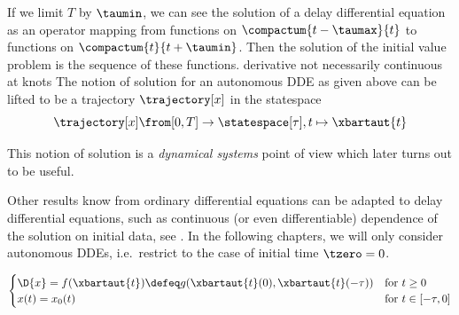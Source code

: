        \cite{Roussel04DDEs}
    If we limit $T$ by $\taumin$, we can see the solution of a delay differential equation as an operator mapping from functions on $\compactum{t-\taumax}{t}$ to functions on $\compactum{t}{t+\taumin}$.
    Then the solution of the initial value problem is the sequence of these functions.
    derivative not necessarily continuous at knots
    The notion of solution for an autonomous DDE as given above can be lifted to be a trajectory $\trajectory[x]$ in the statespace
    \begin{equation}
        \trajectory[x] \from [0,T] \to \statespace[\tau],\\
        t \mapsto \xbartaut{t}
    \end{equation}

    This notion of solution is a \emph{dynamical systems} point of view which later turns out to be useful.

    Other results know from ordinary differential equations can be adapted to delay differential equations, such as continuous (or even differentiable) dependence of the solution on initial data, see \cite{Dads06DDEs}. %
    In the following chapters, we will only consider autonomous DDEs, i.e.\ restrict to the case of initial time $\tzero=0$.



    \begin{equation}
        \begin{cases}
            \D{x}=f(\xbartaut{t})\defeq g(\xbartaut{t}(0),\xbartaut{t}(-\tau)) &\text{for } t\geq 0\\
            x(t)=x_0(t) & \text{for } t\in[-\tau,0]
        \end{cases}
    \end{equation}



